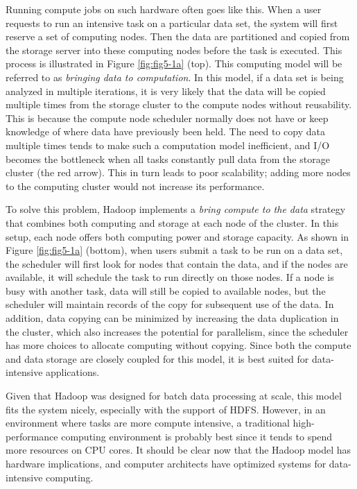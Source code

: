 \documentclass[]{krantz}
\begin{document}
Running compute jobs on such hardware often goes like this. When a user
requests to run an intensive task on a particular data set, the system
will first reserve a set of computing nodes. Then the data are
partitioned and copied from the storage server into these computing
nodes before the task is executed. This process is illustrated in Figure
\ref{fig:fig5-1a} (top). This computing model will be referred to as
\emph{bringing data to computation}. In this model, if a data set is
being analyzed in multiple iterations, it is very likely that the data
will be copied multiple times from the storage cluster to the compute
nodes without reusability. This is because the compute node scheduler
normally does not have or keep knowledge of where data have previously
been held. The need to copy data multiple times tends to make such a
computation model inefficient, and I/O becomes the bottleneck when all
tasks constantly pull data from the storage cluster (the red arrow).
This in turn leads to poor scalability; adding more nodes to the
computing cluster would not increase its performance.

To solve this problem, Hadoop implements a \emph{bring compute to the
data} strategy that combines both computing and storage at each node of
the cluster. In this setup, each node offers both computing power and
storage capacity. As shown in Figure \ref{fig:fig5-1a} (bottom), when
users submit a task to be run on a data set, the scheduler will first
look for nodes that contain the data, and if the nodes are available, it
will schedule the task to run directly on those nodes. If a node is busy
with another task, data will still be copied to available nodes, but the
scheduler will maintain records of the copy for subsequent use of the
data. In addition, data copying can be minimized by increasing the data
duplication in the cluster, which also increases the potential for
parallelism, since the scheduler has more choices to allocate computing
without copying. Since both the compute and data storage are closely
coupled for this model, it is best suited for data-intensive
applications.

Given that Hadoop was designed for batch data processing at scale, this
model fits the system nicely, especially with the support of HDFS.
However, in an environment where tasks are more compute intensive, a
traditional high-performance computing environment is probably best
since it tends to spend more resources on CPU cores. It should be clear
now that the Hadoop model has hardware implications, and computer
architects have optimized systems for data-intensive computing.
\end{document}
